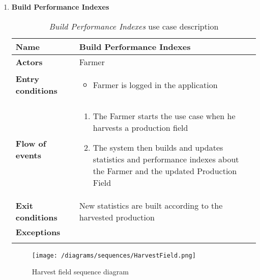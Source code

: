 \begin{enumerate}
			\item \textbf{Build Performance Indexes}
				\begin{longtable}{p{0.26\linewidth}p{0.75\linewidth}}
					\toprule
					\textbf{Name} & \textbf{Build Performance Indexes} \\
					\midrule
					\textbf{Actors} & Farmer \\
					\midrule
					\textbf{Entry conditions} & \begin{itemize}
													\item Farmer is logged in the application
												\end{itemize} \\
					\midrule
					\textbf{Flow of events} & 
					\begin{enumerate}
						\item The Farmer starts the use case when he harvests a production field
						\item The system then builds and updates statistics and performance indexes about the Farmer and the updated Production Field
					\end{enumerate} \\
					\midrule
					\textbf{Exit conditions} & New statistics are built according to the harvested production\\
					\midrule
					\textbf{Exceptions} &  \\
					\bottomrule
					\caption{\emph{Build Performance Indexes} use case description}
				\end{longtable}
			
				\begin{figure}[hbtp]
					\centering
					\texttt{[image: /diagrams/sequences/HarvestField.png]}
					\caption{Harvest field sequence diagram}
				\end{figure}
			

\end{enumerate}
